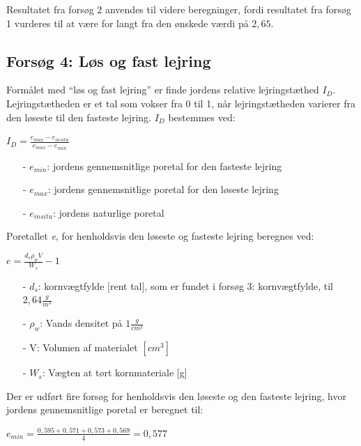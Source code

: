 Resultatet fra forsøg 2 anvendes til videre beregninger, fordi resultatet fra forsøg 1 vurderes til at være for langt fra den ønskede værdi på $2,\!65$.

\subsection{Forsøg 4: Løs og fast lejring}
Formålet med “løs og fast lejring” er finde jordens relative lejringstæthed $I_D$. Lejringstætheden er et tal som vokser fra 0 til 1, når lejringstætheden varierer fra den løseste til den fasteste lejring.
\newline
\newline
$I_D$ bestemmes ved:

\begin{center}
	$I_D = \frac{e_{max} - e_{in situ}}{e_{max} - e_{min}}$
\end{center}

\begin{itemize}
	\item[-] $e_{min}$: jordens gennemsnitlige poretal for den fasteste lejring 
	\item[-] $e_{max}$: jordens gennemsnitlige poretal for den løseste lejring
	\item[-] $e_{in situ}$: jordens naturlige poretal 
\end{itemize}

Poretallet \textit{e}, for henholdsvis den løseste og fasteste lejring beregnes ved:

\begin{center}
	$e = \frac{d_s \rho_w  V}{W_s} - 1$
\end{center}

\begin{itemize}
	\item[-] $d_s$: kornvægtfylde [rent tal], som er fundet i forsøg 3: kornvægtfylde, til $2,\!64 \frac{g}{m^3}$ 
	\item[-] $\rho_w$: Vands densitet på $1 \frac{g}{cm^3}$
	\item[-] V: Volumen af materialet $[cm^3]$
	\item[-] $W_s$: Vægten at tørt kornmateriale [g]
\end{itemize}

Der er udført fire forsøg for henholdsvis den løseste og den fasteste lejring, hvor jordens gennemsnitlige poretal er beregnet til:

\begin{center}
	$e_{min} = \frac{0,\!595 + 0,\!571 + 0,\!573 + 0,\!569}{4} = 0,\!577$
\end{center}

